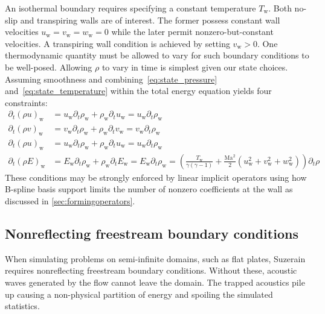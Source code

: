\documentclass[letterpaper,11pt,nointlimits,reqno,draft]{amsbook}
\newcommand{\Mach}[1][]{\ensuremath{\mbox{Ma}_{#1}}}
\begin{document}
An isothermal boundary requires specifying a constant temperature
$T_\mathrm{w}$.  Both no-slip and transpiring walls are of interest.  The
former possess constant wall velocities $u_\mathrm{w} = v_\mathrm{w} =
w_\mathrm{w} = 0$ while the later permit nonzero-but-constant velocities.  A
transpiring wall condition is achieved by setting $v_\mathrm{w} > 0$.  One
thermodynamic quantity must be allowed to vary for such boundary conditions to
be well-posed.  Allowing $\rho$ to vary in time is simplest given our state
choices.  Assuming smoothness and combining~\eqref{eq:state_pressure}
and~\eqref{eq:state_temperature} within the total energy equation yields four
constraints:
\begin{align}
   \partial_t \left(\rho u\right)_\mathrm{w}
&= u_\mathrm{w} \partial_t \rho_\mathrm{w} + \rho_\mathrm{w} \partial_t u_\mathrm{w}
 = u_\mathrm{w} \partial_t \rho_\mathrm{w}
\\
   \partial_t \left(\rho v\right)_\mathrm{w}
&= v_\mathrm{w} \partial_t \rho_\mathrm{w} + \rho_\mathrm{w} \partial_t v_\mathrm{w}
 = v_\mathrm{w} \partial_t \rho_\mathrm{w}
\\
   \partial_t \left(\rho u\right)_\mathrm{w}
&= u_\mathrm{w} \partial_t \rho_\mathrm{w} + \rho_\mathrm{w} \partial_t u_\mathrm{w}
 = u_\mathrm{w} \partial_t \rho_\mathrm{w}
\\
   \partial_t \left(\rho E\right)_\mathrm{w}
&= E_\mathrm{w} \partial_t \rho_\mathrm{w} + \rho_\mathrm{w} \partial_t E_\mathrm{w}
 = E_\mathrm{w} \partial_t \rho_\mathrm{w}
 = \left(
     \frac{T_\mathrm{w}}{\gamma\left(\gamma-1\right)}
   + \frac{\Mach^2}{2}\left(u_\mathrm{w}^2+v_\mathrm{w}^2+w_\mathrm{w}^2\right)
   \right) \partial_{t} \rho
\end{align}
These conditions may be strongly enforced by linear implicit operators using
how B-spline basis support limits the number of nonzero coefficients at the
wall as discussed in \autoref{sec:formingoperators}.

\subsection{Nonreflecting freestream boundary conditions}
\label{sec:nonreflectingbcs}

When simulating problems on semi-infinite domains, such as flat plates,
Suzerain requires nonreflecting freestream boundary conditions.  Without these,
acoustic waves generated by the flow cannot leave the domain.   The trapped
acoustics pile up causing a non-physical partition of energy and spoiling the
simulated statistics.
\end{document}
